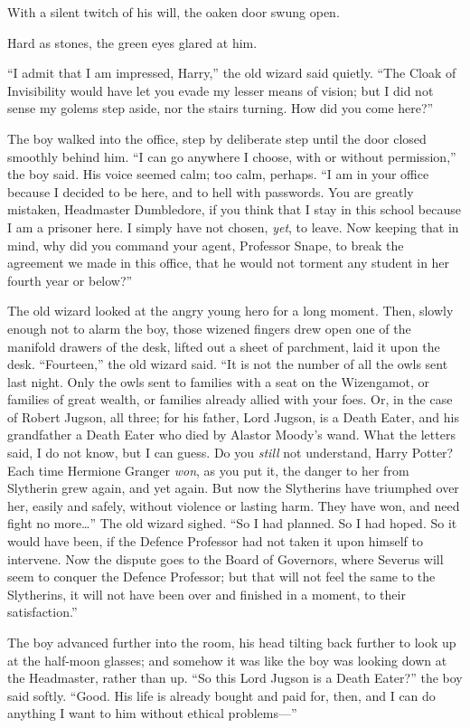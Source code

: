 With a silent twitch of his will, the oaken door swung open.

Hard as stones, the green eyes glared at him.

“I admit that I am impressed, Harry,” the old wizard said quietly. “The Cloak of Invisibility would have let you evade my lesser means of vision; but I did not sense my golems step aside, nor the stairs turning. How did you come here?”

The boy walked into the office, step by deliberate step until the door closed smoothly behind him. “I can go anywhere I choose, with or without permission,” the boy said. His voice seemed calm; too calm, perhaps. “I am in your office because I decided to be here, and to hell with passwords. You are greatly mistaken, Headmaster Dumbledore, if you think that I stay in this school because I am a prisoner here. I simply have not chosen, \emph{yet}, to leave. Now keeping that in mind, why did you command your agent, Professor Snape, to break the agreement we made in this office, that he would not torment any student in her fourth year or below?”

The old wizard looked at the angry young hero for a long moment. Then, slowly enough not to alarm the boy, those wizened fingers drew open one of the manifold drawers of the desk, lifted out a sheet of parchment, laid it upon the desk. “Fourteen,” the old wizard said. “It is not the number of all the owls sent last night. Only the owls sent to families with a seat on the Wizengamot, or families of great wealth, or families already allied with your foes. Or, in the case of Robert Jugson, all three; for his father, Lord Jugson, is a Death Eater, and his grandfather a Death Eater who died by Alastor Moody’s wand. What the letters said, I do not know, but I can guess. Do you \emph{still} not understand, Harry Potter? Each time Hermione Granger \emph{won}, as you put it, the danger to her from Slytherin grew again, and yet again. But now the Slytherins have triumphed over her, easily and safely, without violence or lasting harm. They have won, and need fight no more…” The old wizard sighed. “So I had planned. So I had hoped. So it would have been, if the Defence Professor had not taken it upon himself to intervene. Now the dispute goes to the Board of Governors, where Severus will seem to conquer the Defence Professor; but that will not feel the same to the Slytherins, it will not have been over and finished in a moment, to their satisfaction.”

The boy advanced further into the room, his head tilting back further to look up at the half-moon glasses; and somehow it was like the boy was looking down at the Headmaster, rather than up. “So this Lord Jugson is a Death Eater?” the boy said softly. “Good. His life is already bought and paid for, then, and I can do anything I want to him without ethical problems—”

